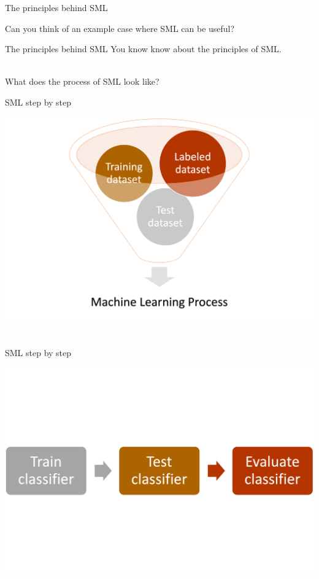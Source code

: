\documentclass[compress]{beamer}
\begin{document}
\begin{frame}{The principles behind SML} 
	
Can you think of an example case where SML can be useful?
	
\end{frame}


\begin{frame}{The principles behind SML} 
You know know about the principles of SML. \\\
	
What does the process of SML look like?
\end{frame}


\begin{frame}{SML step by step}
	
\begin{center}
	\includegraphics[width=\linewidth,height=\textheight,keepaspectratio]{../pictures/MLingredients.png} \\\
\end{center}
\end{frame}


\begin{frame}{SML step by step}
	
\begin{center}
\includegraphics[width=\linewidth,height=\textheight,keepaspectratio]{../pictures/MLprocess.png} \\\
\end{center}
\end{frame}
\end{document}
